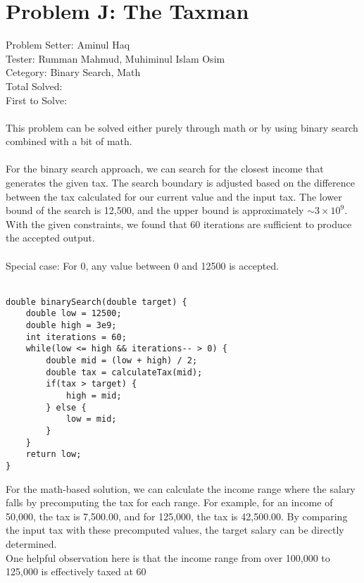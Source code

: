 \section*{Problem J: The Taxman}
Problem Setter: Aminul Haq \\
Tester: Rumman Mahmud,  Muhiminul Islam Osim \\
Cetegory: Binary Search, Math \\
Total Solved:  \\
First to Solve: \\
\\
This problem can be solved either purely through math or by using binary search combined with a bit of math. \\
\\
For the binary search approach, we can search for the closest income that generates the given tax. The search boundary is adjusted based on the difference between the tax calculated for our current value and the input tax. The lower bound of the search is 12,500, and the upper bound is approximately \(\sim 3 \times 10^9\). With the given constraints, we found that 60 iterations are sufficient to produce the accepted output.\\
\\
Special case: For 0, any value between 0 and 12500 is accepted.\\
\\
\begin{verbatim}
double binarySearch(double target) {
    double low = 12500;
    double high = 3e9;
    int iterations = 60;
    while(low <= high && iterations-- > 0) {
        double mid = (low + high) / 2;
        double tax = calculateTax(mid);
        if(tax > target) {
            high = mid;
        } else {
            low = mid;
        }
    }
    return low;
}
\end{verbatim}

For the math-based solution, we can calculate the income range where the salary falls by precomputing the tax for each range. For example, for an income of 50,000, the tax is 7,500.00, and for 125,000, the tax is 42,500.00. By comparing the input tax with these precomputed values, the target salary can be directly determined.\\
One helpful observation here is that the income range from over 100,000 to 125,000 is effectively taxed at 60%
\\
